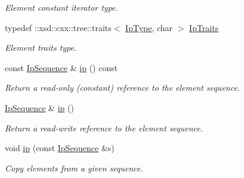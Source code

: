 \begin{DoxyCompactItemize}
\begin{DoxyCompactList}\small\item\em Element constant iterator type. \item\end{DoxyCompactList}\item 
\hypertarget{classopenstack_1_1xml_1_1AddressList_a1381259480e5349d4243b16c7e012a36}{
typedef ::xsd::cxx::tree::traits$<$ \hyperlink{classopenstack_1_1xml_1_1Address}{IpType}, char $>$ \hyperlink{classopenstack_1_1xml_1_1AddressList_a1381259480e5349d4243b16c7e012a36}{IpTraits}}
\label{classopenstack_1_1xml_1_1AddressList_a1381259480e5349d4243b16c7e012a36}

\begin{DoxyCompactList}\small\item\em Element traits type. \item\end{DoxyCompactList}\item 
const \hyperlink{classopenstack_1_1xml_1_1AddressList_ac04d0089c0ec07b9d63eb6ea5bb1bdf4}{IpSequence} \& \hyperlink{classopenstack_1_1xml_1_1AddressList_a2dc3657d0a3e73d22b4c91c6a2a1dfa9}{ip} () const 
\begin{DoxyCompactList}\small\item\em Return a read-\/only (constant) reference to the element sequence. \item\end{DoxyCompactList}\item 
\hyperlink{classopenstack_1_1xml_1_1AddressList_ac04d0089c0ec07b9d63eb6ea5bb1bdf4}{IpSequence} \& \hyperlink{classopenstack_1_1xml_1_1AddressList_a6f5c904984b1b128eee4ff0cea6d3b21}{ip} ()
\begin{DoxyCompactList}\small\item\em Return a read-\/write reference to the element sequence. \item\end{DoxyCompactList}\item 
void \hyperlink{classopenstack_1_1xml_1_1AddressList_a83204ae4cabc67e3e476bb63d7f5678a}{ip} (const \hyperlink{classopenstack_1_1xml_1_1AddressList_ac04d0089c0ec07b9d63eb6ea5bb1bdf4}{IpSequence} \&s)
\begin{DoxyCompactList}\small\item\em Copy elements from a given sequence. \item\end{DoxyCompactList}\end{DoxyCompactItemize}
